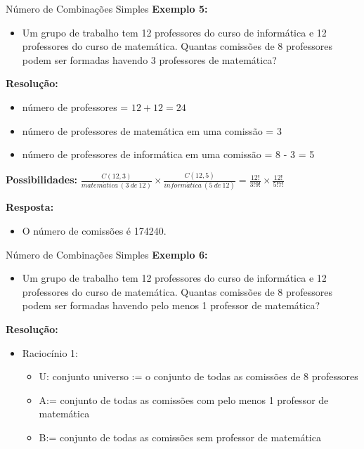 \documentclass[aspectratio=169]{beamer}
\begin{document}
\begin{frame}{Número de Combinações Simples}
    \textbf{Exemplo 5:}
    \begin{itemize}
        \item[] Um grupo de trabalho tem 12 professores do curso de informática e 12 professores do curso de matemática. Quantas comissões de 8 professores podem ser formadas havendo 3 professores de matemática?
    \end{itemize}

    \pause
    \vspace{2mm}

    \textbf{Resolução:}

    \begin{itemize}
        \item[] número de professores = $12 + 12 = 24$ \pause
        \item[] número de professores de matemática em uma comissão = 3 \pause
        \item[] número de professores de informática em uma comissão = 8 - 3 = 5
    \end{itemize}

    \pause
    \textbf{Possibilidades:} $\frac{C(12,3)}{matem\acute{a}tica ~ (3 ~ de ~ 12)} \times \frac{C(12,5)}{inform\acute{a}tica ~ (5 ~ de ~ 12)} = \frac{12!}{3! 9!} \times \frac{12!}{5! 7!}$

    \vspace{2mm}
    \textbf{Resposta:}
    \begin{itemize}
        \item[] O número de comissões é 174240.
    \end{itemize}
\end{frame}


\begin{frame}{Número de Combinações Simples}
    \textbf{Exemplo 6:}
    \begin{itemize}
        \item[] Um grupo de trabalho tem 12 professores do curso de informática e 12 professores do curso de matemática. Quantas comissões de 8 professores podem ser formadas havendo pelo menos 1 professor de matemática?
    \end{itemize}

    \pause
    \vspace{2mm}

    \textbf{Resolução:}

    \begin{itemize}
        \item Raciocínio 1:
        \begin{itemize}
        \item[] U: conjunto universo := o conjunto de todas as comissões de 8 professores  \pause
        \item[] A:= conjunto de todas as comissões com pelo menos 1 professor de matemática \pause
        \item[] B:= conjunto de todas as comissões sem professor de matemática
        \end{itemize}
    \end{itemize}

\end{frame}
\end{document}

